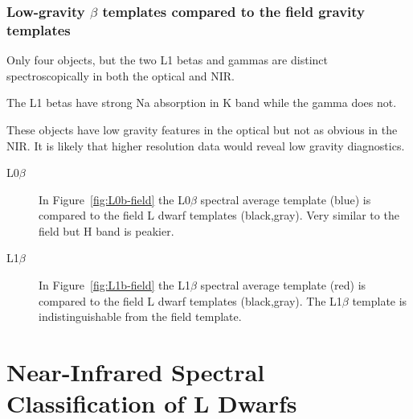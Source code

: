 \documentclass[12pt,preprint]{aastex}
\begin{document}
\subsubsection{Low-gravity $\beta$ templates compared to the field gravity templates}

Only four objects, but the two L1 betas and gammas are distinct spectroscopically in both the optical and NIR.

The L1 betas have strong Na absorption in K band while the gamma does not.

These objects have low gravity features in the optical but not as obvious in the NIR.
It is likely that higher resolution data would reveal low gravity diagnostics.

\begin{description}
\item[L0$\beta$]{
In Figure~\ref{fig:L0b-field} the L0$\beta$ spectral average template (blue) is compared to the field L dwarf templates (black,gray). Very similar to the field but H band is peakier.}

\item[L1$\beta$]{
In Figure~\ref{fig:L1b-field} the L1$\beta$ spectral average template (red) is compared to the field L dwarf templates (black,gray). The L1$\beta$ template is indistinguishable from the field template.
}
\end{description}

\clearpage
\section{Near-Infrared Spectral Classification of L Dwarfs}
\label{sec:classification}
\end{document}
